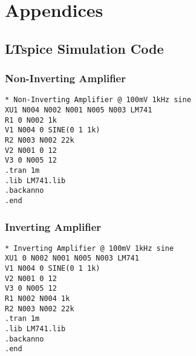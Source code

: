 \chapter{Appendices}

\section{LTspice Simulation Code}

\subsection{Non-Inverting Amplifier}

\begin{lstlisting}
* Non-Inverting Amplifier @ 100mV 1kHz sine
XU1 N004 N002 N001 N005 N003 LM741
R1 0 N002 1k
V1 N004 0 SINE(0 1 1k)
R2 N003 N002 22k
V2 N001 0 12
V3 0 N005 12
.tran 1m
.lib LM741.lib
.backanno
.end
\end{lstlisting}


\subsection{Inverting Amplifier}

\begin{lstlisting}
* Inverting Amplifier @ 100mV 1kHz sine
XU1 0 N002 N001 N005 N003 LM741
V1 N004 0 SINE(0 1 1k)
V2 N001 0 12
V3 0 N005 12
R1 N002 N004 1k
R2 N003 N002 22k
.tran 1m
.lib LM741.lib
.backanno
.end
\end{lstlisting}
